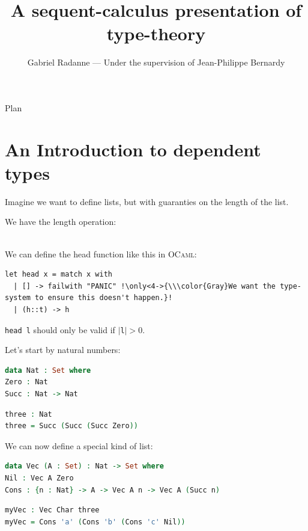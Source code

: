 \documentclass[xcolor=svgnames,11pt]{beamer}
\title{A sequent-calculus presentation of type-theory}
\author[Gabriel Radanne]{Gabriel Radanne --- Under the supervision of Jean-Philippe Bernardy}
\institute[ENS Rennes]{ENS Rennes --- Chalmers University of Technology}
\newcommand{\mysc}[1]{\textsc{#1}\xspace}
\begin{document}
\begin{frame}[plain]
\titlepage
\end{frame}

\begin{frame}{Plan}
\tableofcontents%
\end{frame}

\section{An Introduction to dependent types}

\begin{frame}[fragile]
  Imagine we want to define lists, but with guaranties on the length of the list.

  We have the length operation:


  \pause\pause
  \ \\We can define the head function like this in \mysc{OCaml}:
\begin{lstlisting}[language=caml]
let head x = match x with
  | [] -> failwith "PANIC" !\only<4->{\\\color{Gray}We want the type-system to ensure this doesn't happen.}!
  | (h::t) -> h
\end{lstlisting}\pause

\lstinline[language=caml,basicstyle=\ttfamily]{head l}
should only be valid if $|$\lstinline[language=caml,basicstyle=\ttfamily]{l}$|>0$.
\end{frame}

\begin{frame}[fragile]
  Let's start by natural numbers:
\begin{lstlisting}[language=Agda]
data Nat : Set where
Zero : Nat
Succ : Nat -> Nat
\end{lstlisting}\pause

\begin{lstlisting}[language=Agda]
three : Nat
three = Succ (Succ (Succ Zero))
\end{lstlisting}\pause

  We can now define a special kind of list:
\begin{lstlisting}[language=Agda]
data Vec (A : Set) : Nat -> Set where
Nil : Vec A Zero
Cons : {n : Nat} -> A -> Vec A n -> Vec A (Succ n)
\end{lstlisting}\pause

\begin{lstlisting}[language=Agda]
myVec : Vec Char three
myVec = Cons 'a' (Cons 'b' (Cons 'c' Nil))
\end{lstlisting}

\end{frame}
\end{document}
